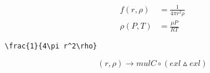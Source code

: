 \documentclass{amsart}
\begin{document}
\begin{align*}
  f(r,\rho) &= \frac{1}{4\pi r^2\rho} \\
  \rho(P,T) &= \frac{\mu P}{R T}
\end{align*}

\begin{verbatim}
\frac{1}{4\pi r^2\rho}
\end{verbatim}

\begin{equation*}
  (r,\rho) \rightarrow mulC \circ (exl \vartriangle exl)
\end{equation*}
\end{document}

